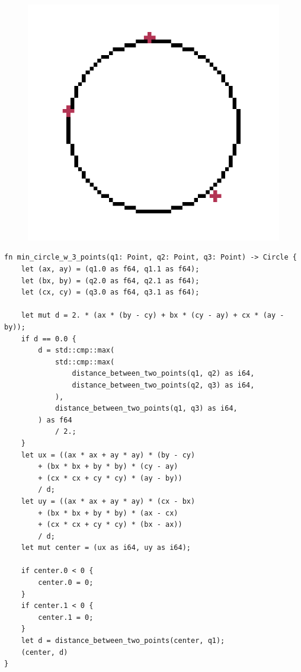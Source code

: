 \documentclass[12pt,a4,oneside,usenames,dvipsnames]{book}
\begin{document}
\begin{figure}[H]
\centering
  \includegraphics[scale=0.25,keepaspectratio]{figures/triangle_circle.png}
\end{figure}

\begin{verbatim}
fn min_circle_w_3_points(q1: Point, q2: Point, q3: Point) -> Circle {
    let (ax, ay) = (q1.0 as f64, q1.1 as f64);
    let (bx, by) = (q2.0 as f64, q2.1 as f64);
    let (cx, cy) = (q3.0 as f64, q3.1 as f64);

    let mut d = 2. * (ax * (by - cy) + bx * (cy - ay) + cx * (ay - by));
    if d == 0.0 {
        d = std::cmp::max(
            std::cmp::max(
                distance_between_two_points(q1, q2) as i64,
                distance_between_two_points(q2, q3) as i64,
            ),
            distance_between_two_points(q1, q3) as i64,
        ) as f64
            / 2.;
    }
    let ux = ((ax * ax + ay * ay) * (by - cy)
        + (bx * bx + by * by) * (cy - ay)
        + (cx * cx + cy * cy) * (ay - by))
        / d;
    let uy = ((ax * ax + ay * ay) * (cx - bx)
        + (bx * bx + by * by) * (ax - cx)
        + (cx * cx + cy * cy) * (bx - ax))
        / d;
    let mut center = (ux as i64, uy as i64);

    if center.0 < 0 {
        center.0 = 0;
    }
    if center.1 < 0 {
        center.1 = 0;
    }
    let d = distance_between_two_points(center, q1);
    (center, d)
}
\end{verbatim}
\end{document}
